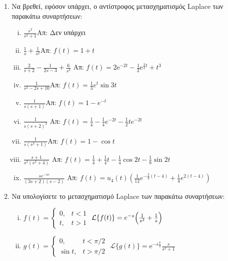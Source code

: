 \begin{enumerate}
  \item Να βρεθεί, εφόσον υπάρχει, ο αντίστροφος μετασχηματισμός Laplace των 
    παρακάτω συναρτήσεων:
    \begin{enumerate}[i)]
      \item $\frac{s^2}{s^2+1}$\hfill Απ: Δεν υπάρχει
      \item $\frac{1}{s}+\frac{1}{s^2}$\hfill Απ: $f(t)=1+t$
      \item $ \frac{2}{s+2} - \frac{1}{2s-3} + \frac{6}{s^{4}} $ 
        \hfill Απ: $ f(t) = 2 \mathrm{e}^{-2t}-\frac{1}{2} \mathrm{e}^{\frac{3}{2} t} +
        t^{3}$  
      \item $\frac{1}{s^2-2s+10}$\hfill Απ: $f(t)=\frac{1}{3}e^t\sin 3t$
      \item $\frac{1}{s(s+1)}$\hfill Απ: $f(t)=1-e^{-t}$
      \item $\frac{1}{s(s+2)^2}$
        \hfill Απ: $f(t)=\frac{1}{4}-\frac{1}{4}e^{-2t}-\frac{1}{2}te^{-2t}$
      \item $\frac{1}{s(s^2+1)}$\hfill Απ: $f(t)=1-\cos t$
      \item $\frac{s+1}{s^{2}(s^{2}+4)}$ 
        \hfill Απ: $f(t)=\frac{1}{4}+\frac{1}{4}t-\frac{1}{4}\cos 2t -\frac{1}{8}\sin 2t$
      \item $\frac{se^{-4s}}{(3s+2)(s-2)}$ 
        \hfill Απ: $f(t)=u_{4}(t)\left(\frac{1}{12}e^{-\frac{2}{3}(t-4)}+
        \frac{1}{4}e^{2(t-4)}\right)$

    \end{enumerate}

  \item Να υπολογίσετε το μετασχηματισμό Laplace των παρακάτω συναρτήσεων:
    \begin{enumerate}[i)]
      \item $f(t)=
        \begin{cases} 
          0, & t<1 \\ t, & t>1 
        \end{cases}$ 
        \hfill $\mathcal{L}\{f(t)\}=e^{-s}\Bigl(\frac{1}{s^2}+\frac{1}{s}\Bigr)$

      \item $g(t)=
        \begin{cases} 
          0, & t<{\pi}/{2} \\ \sin t, & t>{\pi}/{2}
        \end{cases}$ 
        \hfill $\mathcal{L}\{g(t)\}= \mathrm{e}^{-s\frac{\pi}{2}}\frac{s}{s^2+1}$


\end{enumerate}
\end{enumerate}
